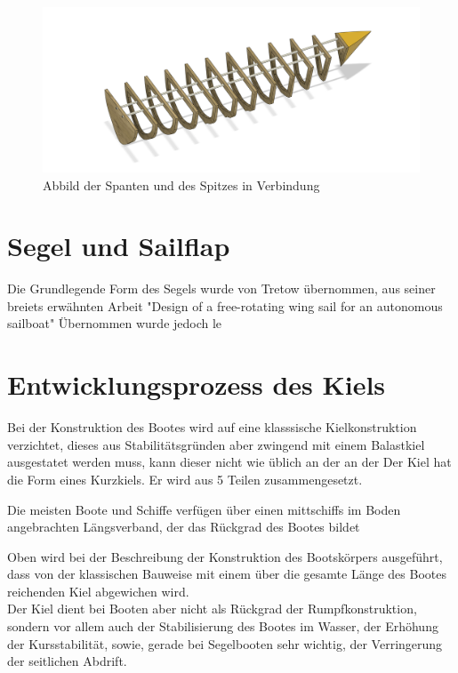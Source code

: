 \begin{figure}[H]
    \centering
    \includegraphics[width=1\linewidth]{assets/full_skellet.png}
    \caption{Abbild der Spanten und des Spitzes in Verbindung}
    
\end{figure}




\section{Segel und Sailflap}
Die Grundlegende Form des Segels wurde von Tretow  übernommen, aus seiner breiets erwähnten Arbeit "Design of a free-rotating wing sail for an autonomous sailboat" \cite{Tretow2017DesignOA}
Übernommen wurde jedoch le

\section{Entwicklungsprozess des Kiels}

Bei der  Konstruktion des Bootes wird auf eine klasssische Kielkonstruktion verzichtet, dieses aus Stabilitätsgründen aber zwingend mit einem Balastkiel ausgestatet werden muss, kann dieser nicht wie üblich an der an der Der Kiel hat die Form eines Kurzkiels. Er  wird aus  5  Teilen zusammengesetzt. 


Die meisten Boote und Schiffe verfügen über einen mittschiffs im Boden angebrachten Längsverband, der das Rückgrad des Bootes bildet


Oben wird bei der Beschreibung der Konstruktion des Bootskörpers ausgeführt, dass von der klassischen Bauweise mit einem über die gesamte Länge des Bootes reichenden Kiel abgewichen wird.\\
Der Kiel dient bei Booten aber nicht als Rückgrad der Rumpfkonstruktion, sondern vor allem auch der Stabilisierung des Bootes im Wasser, der Erhöhung der Kursstabilität, sowie, gerade bei Segelbooten sehr wichtig, der Verringerung der seitlichen Abdrift. \\



